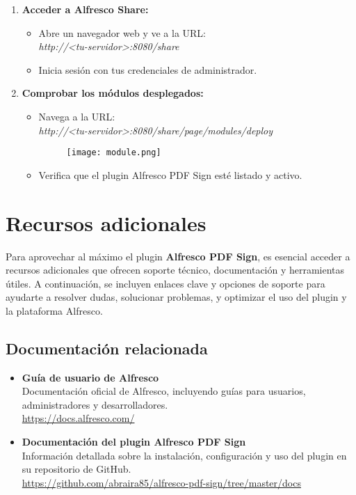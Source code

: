 \documentclass{ol-softwaremanual}
\begin{document}
\begin{enumerate}
	\item \textbf{Acceder a Alfresco Share:}
	\begin{itemize}
	 	\item Abre un navegador web y ve a la URL: \\ \textit{http://<tu-servidor>:8080/share}
	 	\item Inicia sesión con tus credenciales de administrador.
	\end{itemize}
	\item \textbf{Comprobar los módulos desplegados:}
	\begin{itemize}
		\item Navega a la URL: \\ \textit{http://<tu-servidor>:8080/share/page/modules/deploy}
		\begin{figure}[h]
			\centering
			\texttt{[image: module.png]}
			\label{fig:etiqueta_imagen}
		\end{figure}
		\item Verifica que el plugin Alfresco PDF Sign esté listado y activo.
	\end{itemize}
\end{enumerate}

\section{Recursos adicionales}

Para aprovechar al máximo el plugin \textbf{Alfresco PDF Sign}, es esencial acceder a recursos adicionales que ofrecen soporte técnico, documentación y herramientas útiles. A continuación, se incluyen enlaces clave y opciones de soporte para ayudarte a resolver dudas, solucionar problemas, y optimizar el uso del plugin y la plataforma Alfresco.

\subsection{Documentación relacionada}

\begin{itemize}
	\item \textbf{Guía de usuario de Alfresco}\\
	Documentación oficial de Alfresco, incluyendo guías para usuarios, administradores y desarrolladores.\\
	\url{https://docs.alfresco.com/}
	
	\item \textbf{Documentación del plugin Alfresco PDF Sign}\\
	Información detallada sobre la instalación, configuración y uso del plugin en su repositorio de GitHub.\\
	\url{https://github.com/abraira85/alfresco-pdf-sign/tree/master/docs}
\end{itemize}
\end{document}
